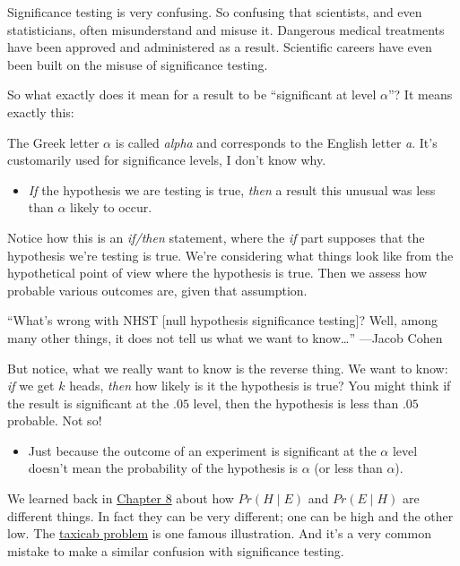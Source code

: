 \documentclass[justified]{tufte-book}
\newcommand{\given}{\mid}
\newcommand{\p}{Pr}
\newenvironment{warning}{\begin{itemize}\item[\faBan]}{\end{itemize}}
\theoremstyle{definition}
\theoremstyle{definition}
\theoremstyle{definition}
\theoremstyle{definition}
\theoremstyle{remark}
\begin{document}
Significance testing is very confusing. So confusing that scientists, and even statisticians, often misunderstand and misuse it. Dangerous medical treatments have been approved and administered as a result. Scientific careers have even been built on the misuse of significance testing.

So what exactly does it mean for a result to be ``significant at level \(\alpha\)''? It means exactly this:

\begin{marginfigure}
The Greek letter \(\alpha\) is called \emph{alpha} and corresponds to
the English letter \emph{a}. It's customarily used for significance
levels, I don't know why.
\end{marginfigure}

\begin{warning}
\emph{If} the hypothesis we are testing is true, \emph{then} a result
this unusual was less than \(\alpha\) likely to occur.
\end{warning}

Notice how this is an \emph{if/then} statement, where the \emph{if} part supposes that the hypothesis we're testing is true. We're considering what things look like from the hypothetical point of view where the hypothesis is true. Then we assess how probable various outcomes are, given that assumption.

\begin{marginfigure}
``What's wrong with NHST {[}null hypothesis significance testing{]}?
Well, among many other things, it does not tell us what we want to
know\ldots{}'' ---Jacob Cohen
\end{marginfigure}

But notice, what we really want to know is the reverse thing. We want to know: \emph{if} we get \(k\) heads, \emph{then} how likely is it the hypothesis is true? You might think if the result is significant at the \(.05\) level, then the hypothesis is less than \(.05\) probable. Not so!

\begin{warning}
Just because the outcome of an experiment is significant at the
\(\alpha\) level doesn't mean the probability of the hypothesis is
\(\alpha\) (or less than \(\alpha\)).
\end{warning}

We learned back in \protect\hyperlink{bayes-theorem}{Chapter 8} about how \(\p(H \given E)\) and \(\p(E \given H)\) are different things. In fact they can be very different; one can be high and the other low. The \protect\hyperlink{fig:taxigrid}{taxicab problem} is one famous illustration. And it's a very common mistake to make a similar confusion with significance testing.
\end{document}
